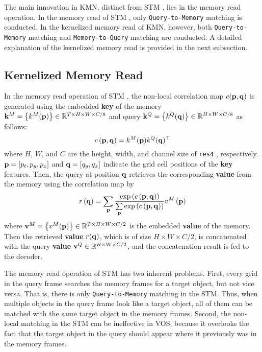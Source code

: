 \documentclass[runningheads]{llncs}
\begin{document}
The main innovation in KMN, distinct from STM \cite{Oh_2019_ICCV}, lies in the memory read operation. In the memory read of STM \cite{Oh_2019_ICCV}, only \texttt{Query-to-Memory} matching is conducted. In the kernelized memory read of KMN. however, both \texttt{Query-to-Memory} matching and \texttt{Memory-to-Query} matching are conducted. A detailed explanation of the kernelized memory read is provided in the next subsection.


\subsection{Kernelized Memory Read}
\label{s32}
In the memory read operation of STM \cite{Oh_2019_ICCV}, the non-local correlation map $c ( {\bf{p}} , {\bf{q}} )$ is generated using the embedded \textbf{key} of the memory ${{\bf{k}}^{M}} = \left\{ {{{k}}^{M}} ( {\bf{p}} ) \right\} \in {\mathbb{R}^{T \times H \times W \times C/8}}$ and query ${{\bf{k}}^{Q}} = \left\{ {{{k}}^{Q}} ( {\bf{q}} ) \right\} \in {\mathbb{R}^{H \times W \times C/8}}$ as follows:
\begin{equation}
c \left( {\bf{p}} , {\bf{q}} \right) = {{{{k}}^{M}}({\bf{p}})} {k^Q}({\bf{q}})^\top
\label{eq1}
\end{equation}
where $H$, $W$, and $C$ are the height, width, and channel size of \texttt{res4} \cite{b23}, respectively. ${\bf{p}} = \left[ p_t, p_y, p_x \right]$ and ${\bf{q}} = \left[ q_y , q_x \right]$ indicate the grid cell positions of the \textbf{key} features. Then, the query at position ${\bf{q}}$ retrieves the corresponding \textbf{value} from the memory using the correlation map by
\begin{equation}
r\left( {\bf{q}} \right) = \sum\limits_{\bf{p}} {\frac{{\exp \left( {c\left( {{\bf{p}},{\bf{q}}} \right)} \right)}}{{\sum\limits_{\bf{p}} {\exp } \left( {c\left( {{\bf{p}},{\bf{q}}} \right)} \right)}}} {v^M}\left( {\bf{p}} \right)
\label{eq2}
\end{equation}
where ${{\bf{v}}^{M}} = \left\{ {{{v}}^{M}} ( {\bf{p}} ) \right\} \in {\mathbb{R}^{T \times H \times W \times C/2}}$ is the embedded \textbf{value} of the memory. Then the retrieved \textbf{value} ${r}({\bf{q}})$, which is of size ${H \times W \times C/2}$, is concatenated with the query \textbf{value} ${{\bf{v}}^{Q}}\in {\mathbb{R}^{H \times W \times C/2}}$, and the concatenation result is fed to the decoder.

The memory read operation of STM \cite{Oh_2019_ICCV} has two inherent problems. First, every grid in the query frame searches the memory frames for a target object, but not vice versa. That is, there is only \texttt{Query-to-Memory} matching in the STM. Thus, when multiple objects in the query frame look like a target object, all of them can be matched with the same target object in the memory frames. Second, the non-local matching in the STM can be ineffective in VOS, because it overlooks the fact that the target object in the query should appear where it previously was in the memory frames.
\end{document}
